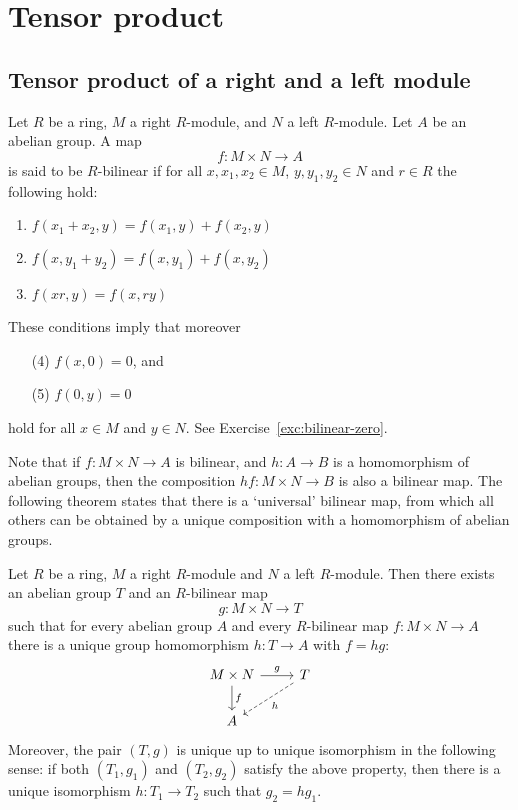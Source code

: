 
\chapter{Tensor product}


\section{Tensor product of a right and a left module}

\begin{definition}
Let $R$ be a  ring, $M$ a right $R$-module, and $N$ a left $R$-module. Let $A$ be an abelian group. A map
\[
	f\colon M\times N \to A
\]
is said to be $R$-bilinear if for all $x, x_1,x_2\in M$, $y, y_1,y_2\in N$ and $r\in R$ the following hold:
\begin{enumerate}
\item $f(x_1+x_2,y)=f(x_1,y) + f(x_2,y)$
\item $f(x,y_1+y_2) = f(x,y_1) + f(x,y_2)$
\item $f(xr,y)=f(x,ry)$ 
\end{enumerate}
\end{definition}

\begin{remark}
These conditions imply that moreover
\begin{enumerate}
\item [(4)] $f(x,0)=0$, and
\item[(5)] $f(0,y) =0$
\end{enumerate}
hold for all $x\in M$ and $y\in N$. See Exercise~\ref{exc:bilinear-zero}.
\end{remark}


Note that if $f\colon M\times N\to A$ is bilinear, and $h\colon A\to B$ is a homomorphism of abelian groups, then the composition $hf\colon M\times N \to B$ is also a bilinear map. The following theorem states that there is a `universal' bilinear map, from which all others can be obtained by a unique composition with a homomorphism of abelian groups.

\begin{theorem}\label{thm:existence-of-tensor-product}
Let $R$ be a ring, $M$ a right $R$-module and $N$ a left $R$-module. Then there exists an abelian group $T$ and an $R$-bilinear map
\[
	g\colon M\times N \to T
\]
such that for every abelian group $A$ and every $R$-bilinear map $f\colon M\times N \to A$ there is a unique group homomorphism
$h\colon T \to A$ with $f=hg$:
\[
\begin{tikzcd}
M\times N\arrow{r}{g} \arrow{d}{f} & T \arrow[dashed]{ld}{h} \\
A
\end{tikzcd}
\]
Moreover, the pair $(T,g)$ is unique up to unique isomorphism in the following sense: if both $(T_1,g_1)$ and $(T_2,g_2)$ satisfy the above property, then there is a unique isomorphism $h\colon T_1 \to T_2$ such that $g_2=hg_1$.
\end{theorem}


